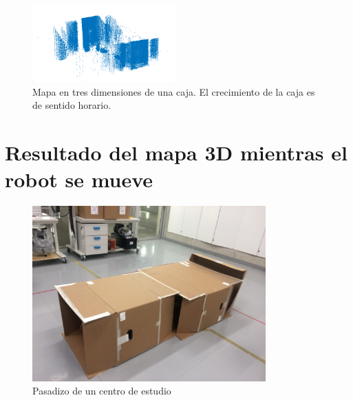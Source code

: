 \begin{figure}
  \includegraphics[width=0.49\textwidth]{images/pasadizo_1.png}
  \captionsetup{font=footnotesize}
  \caption{Mapa en tres dimensiones de una caja. El crecimiento de la caja es de 
  sentido horario.}
  \label{fig:Caja3D}
\end{figure}

\section{Resultado del mapa 3D mientras el robot se mueve}
\begin{figure}
  \centering \footnotesize
  \includegraphics[width=0.80\textwidth]{images/prueba_cajas.JPG}
  \captionsetup{font=footnotesize}
  \caption{Pasadizo de un centro de estudio}
  \label{fig:pasadizoEsan}
\end{figure}


